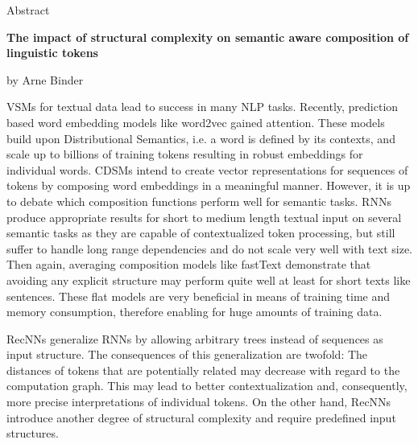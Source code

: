 
\begin{center}
	\huge{Abstract} 
	\vspace{0.5cm}
	 
	\large{\bf{The impact of structural complexity on semantic aware composition of linguistic tokens}} 
	\vspace{0.5cm}

	by Arne Binder \\
\end{center}

\vspace{0.5cm}
\normalsize

\acfp{VSM} for textual data lead to success in many \ac{NLP} tasks. Recently, prediction based word embedding models like word2vec %
gained attention. These models build upon Distributional Semantics, i.e. a word is defined by its contexts, and scale up to billions of training tokens %
resulting in robust embeddings for individual words. 
\acfp{CDSM} intend to create vector representations for sequences of tokens by composing word embeddings in a meaningful manner. However, it is up to debate which composition functions perform well for semantic tasks. \acp{RNN} produce appropriate results for short to medium length textual input on several semantic tasks as they are capable of contextualized token processing, but still suffer to handle long range dependencies and do not scale very well with text size. Then again, averaging composition models like fastText \autocite{joulin_bag_2017} demonstrate that avoiding any explicit structure may perform quite well at least for short texts like sentences. These flat models are very beneficial in means of training time and memory consumption, therefore enabling for huge amounts of training data. 

\acp{RecNN} generalize \acp{RNN} by allowing arbitrary trees instead of sequences as input structure. The consequences of this generalization are twofold: The distances of tokens that are potentially related may decrease with regard to the computation graph. This may lead to better contextualization and, consequently, more precise interpretations of individual tokens. On the other hand, \acp{RecNN} introduce another degree of structural complexity and require predefined input structures. 

